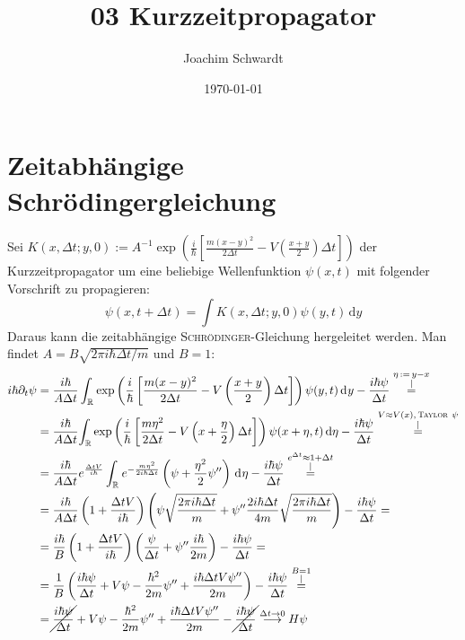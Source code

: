 \documentclass[a4paper,12pt]{article}
\newcommand{\kom}{}
\newcommand{\intx}{}
\newcommand{\kla}{}
\begin{document}
\title{03 Kurzzeitpropagator}
\author{Joachim Schwardt}
\date{\today}
\maketitle

\section{Zeitabhängige Schrödingergleichung}
Sei $K(x,\Delta t;y,0):=A^{-1}\exp\kla\left( {\frac{i}{\hbar}\kla\left[ {\frac{m(x-y)^2}{2\Delta t}-V\kla\left( {\frac{x+y}{2}} \right) \Delta t} \right]  } \right)  $ der Kurzzeitpropagator um eine beliebige Wellenfunktion $\psi(x,t)$ mit folgender Vorschrift zu propagieren:
$$\psi(x, t+\Delta t)=\int K(x, \Delta t;y,0)\psi(y,t)\,\mathrm{d}y$$
Daraus kann die zeitabhängige \textsc{Schrödinger}-Gleichung hergeleitet werden. Man findet $A=B\sqrt{2\pi i\hbar\Delta t/m}$ und $B=1$:
\begin{align*}
i\hbar\partial_t\psi&=\frac{i\hbar}{A\Delta t}\intx\int_{\mathbb{R}^{ }}{\exp\kla\left( {\frac{i}{\hbar}\kla\left[ {\frac{m(x-y)^2}{2\Delta t}-V\kla\left( {\frac{x+y}{2}} \right) \Delta t} \right]  } \right)\psi(y,t)}\,\mathrm{d}^{ }y-\frac{i\hbar\psi}{\Delta t}\kom\overset{\substack{{\eta\,:=\,y-x} \\ |}}{=} \\
&=\frac{i\hbar}{A\Delta t} {\int_{\mathbb{R}} \exp\kla\left( {\frac{i}{\hbar}\kla\left[ {\frac{m\eta^2}{2\Delta t}-V\kla\left( x+{\frac{\eta}{2}} \right) \Delta t} \right]  } \right)\psi(x+\eta,t)}\,\mathrm{d}\eta-\frac{i\hbar\psi}{\Delta t}\kom\overset{\substack{{V\approx V(x),\, \textsc{Taylor}\ \psi} \\ |}}{=} \\
&=\frac{i\hbar}{A\Delta t}e^{\frac{\Delta tV}{i\hbar}}\intx\int_{\mathbb{R}^{ }}{e^{-\frac{m\eta^2}{2i\hbar\Delta t}}}\left(\psi+\frac{\eta^2}{2}\psi''\right)\,\mathrm{d}^{}\eta-\frac{i\hbar\psi}{\Delta t}\kom\overset{\substack{{e^{\Delta t}\approx 1+\Delta t} \\ |}}{=} \\
&=\frac{i\hbar}{A\Delta t}\kla\left( {1+\frac{\Delta tV}{i\hbar}} \right)  \kla\left( {\psi\sqrt{\frac{2\pi i\hbar\Delta t}{m}}+\psi''\frac{2i\hbar\Delta t}{4m}\sqrt{\frac{2\pi i\hbar\Delta t}{m}}} \right) -\frac{i\hbar\psi}{\Delta t}=\\
&=\frac{i\hbar}{B}\kla\left( {1+\frac{\Delta tV}{i\hbar}} \right) \kla\left( \frac{\psi}{\Delta t}+\psi''\frac{i\hbar}{2m} \right) -\frac{i\hbar\psi}{\Delta t} =\\
&=\frac{1}{B}\kla\left( {\frac{i\hbar\psi}{\Delta t}+V\psi-\frac{\hbar^2}{2m}\psi''+\frac{i\hbar\Delta tV\psi''}{2m}} \right) -\frac{i\hbar\psi}{\Delta t}\kom\overset{\substack{{B=1} \\ |}}{=}\\
&=\cancel{\frac{i\hbar\psi}{\Delta t}}+V\psi-\frac{\hbar^2}{2m}\psi''+\frac{i\hbar\Delta tV\psi''}{2m}-\cancel{\frac{i\hbar\psi}{\Delta t}}\overset{\Delta t\rightarrow 0}{\longrightarrow}H\psi
\end{align*}
\end{document}
